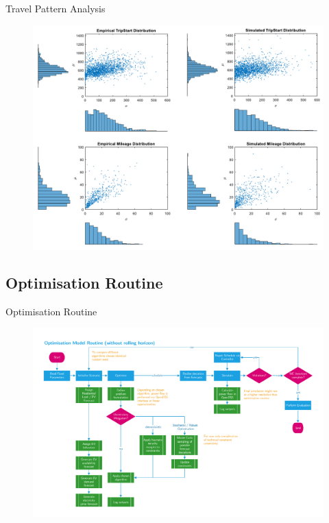 \documentclass[handout]{beamer}
\begin{document}
\begin{frame}{Travel Pattern Analysis}
	\begin{figure}
		\includegraphics[scale = 0.55]{multivariate.pdf}
	\end{figure}		
\end{frame}

\subsection{Optimisation Routine}
\begin{frame}{Optimisation Routine}
	\begin{figure}
		\includegraphics[trim={1cm 1cm 1cm 1cm},clip,width=1.07\linewidth]{optimisationroutine}
	\end{figure}		
\end{frame}
\end{document}
